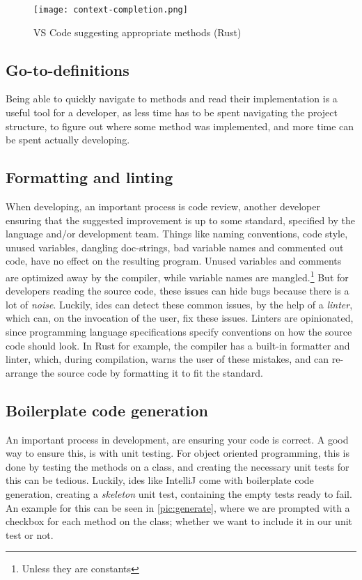 \begin{figure}
  \centering
  \texttt{[image: context-completion.png]}
  \caption{VS Code suggesting appropriate methods (Rust)}
  \label{pic:completion}
\end{figure}

\subsection{Go-to-definitions}

Being able to quickly navigate to methods and read their implementation is a
useful tool for a developer, as less time has to be spent navigating the project
structure, to figure out where some method was implemented, and more time can be
spent actually developing.

\subsection{Formatting and linting}

When developing, an important process is code review, another developer ensuring
that the suggested improvement is up to some standard, specified by the
language and/or development team. Things like naming conventions, code style,
unused variables, dangling doc-strings, bad variable names and commented out
code, have no effect on the resulting program. Unused variables and comments
are optimized away by the compiler, while variable names are mangled.\footnote{Unless they are constants}
But for developers reading the source code, these issues can hide bugs because
there is a lot of \textit{noise}. Luckily, \gls*{ide}s can detect these common
issues, by the help of a \textit{linter}, which can, on the invocation of the
user, fix these issues. Linters are opinionated, since programming language
specifications specify conventions on how the source code should look. In Rust
for example, the compiler has a built-in formatter and linter, which, during
compilation, warns the user of these mistakes, and can re-arrange the source
code by formatting it to fit the standard.

\subsection{Boilerplate code generation}

An important process in development, are ensuring your code is correct. A good
way to ensure this, is with unit testing. For object oriented programming, this
is done by testing the methods on a class, and creating the necessary unit tests
for this can be tedious. Luckily, \gls*{ide}s like IntelliJ come with
boilerplate code generation, creating a \textit{skeleton} unit test, containing
the empty tests ready to fail. An example for this can be seen in
\ref{pic:generate}, where we are prompted with a checkbox for each method on
the class; whether we want to include it in our unit test or not.

